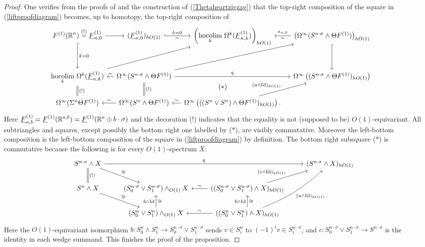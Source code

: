 \documentclass[a4paper, oneside]{amsart}
\DeclareMathOperator{\hocolim}{\operatorname{hocolim}}
\newcommand{\Id}{\mathrm{Id}}
\newcommand{\1}{\mathds{1}}
\theoremstyle{remark}
\theoremstyle{definition}
\newcommand{\R}{{\scaleobj{0.97}{\mathbb{R}}}}
\numberwithin{equation}{section}
\begin{document}
\begin{proof}
One verifies from the proofs of \cite[Prop. 7.2 \& Thm. 7.3]{WeissOrthCalc} and the construction of (\ref{Thetaheartzigzag}) that the top-right composition of the square in (\ref{liftproofdiagram}) becomes, up to homotopy, the top-right composition of
$$
\begin{tikzcd}[row sep = 15pt, column sep = 10pt]
F^{(1)}(\R^n)\overset{(!)}= \underline{F}^{(1)}_{n,0}\ar[dd,hook, "k=0"]\rar & (\underline F^{(1)}_{n,0})_{hO(1)}\rar[hook,"\sim"',"k=0"] & \left(\underset{k}{\hocolim}\ \Omega^k(\underline{F}^{(1)}_{n,k})\right)_{hO(1)} & \lar["s_{n,0}"', "\sim"]\left(\Omega^\infty(S^{n\cdot\sigma}\wedge \Theta F^{(1)})\right)_{hO(1)}\ar[dd,hook]\\
&&&&\\
\underset{k}{\hocolim}\ \Omega^k(\underline F^{(1)}_{n,k})\dar[equal, "(!)"]\ar[uurr]& \ar[uurr] \lar["\sim"'] \Omega^\infty(S^{n\cdot\sigma}\wedge\Theta F^{(1)})\dar[equal, "(!)"]\ar[rr, "q"] &\hspace{3pt}&\Omega^\infty\left((S^{n\cdot\sigma}\wedge \Theta F^{(1)})_{hO(1)}\right)\\
\Omega^\infty(\Sigma^n\Theta F^{(1)}) & \Omega^\infty(S^n\wedge\Theta F^{(1)})\lar["\sim"']&\lar["\sim"']\Omega^\infty\left(((S^n\vee S^n)\wedge \Theta F^{(1)})_{hO(1)}\right).\ar[u, phantom, bend left=50, "(*)"]\ar[ur, "(a\wedge \Id)_{hO(1)}"]&
\end{tikzcd}
$$
Here $\underline{F}^{(1)}_{a,b}=\underline{F}^{(1)}(\R^{a,b})=\underline{F}^{(1)}(\R^{a}\oplus b\cdot\sigma)$ and the decoration (!) indicates that the equality is not (supposed to be) $O(1)$-equivariant. All subtriangles and squares, except possibly the bottom right one labelled by ($*$), are visibly commutative. Moreover the left-bottom composition is the left-bottom composition of the square in (\ref{liftproofdiagram}) by definition. The bottom right subsquare ($*$) is commutative because the following is for every $O(1)$-spectrum $X$:
$$
\begin{tikzcd}
S^{n\cdot\sigma}\wedge X\dar[equal, "(!)"]\ar[rrr,"q"]\ar[dr, "\cong"]&&&(S^{n\cdot\sigma}\wedge X)_{hO(1)}\\
S^n\wedge X\ar[dr, "\cong"] &(S^{n\cdot\sigma}_0\vee S^{n\cdot\sigma}_1)\wedge_{O(1)}X &\lar["\sim"'] ((S^{n\cdot\sigma}_0\vee S^{n\cdot\sigma}_1)\wedge X)_{hO(1)}\ar[ur, "(c\wedge \Id)_{hO(1)}"]&\\
 &(S^{n}_0\vee S^{n}_1)\wedge_{O(1)}X\uar["b\wedge \Id", "\cong"'] &\lar["\sim"'] ((S^{n}_0\vee S^{n}_1)\wedge X)_{hO(1)}\uar["b\wedge \Id", "\cong"']\ar[uur, bend right=10, "(a\wedge \Id)_{hO(1)}"']&
\end{tikzcd}
$$
Here the $O(1)$-equivariant isomorphism $b: S^n_0\wedge S^n_1\to S^{n\cdot\sigma}_0 \vee S^{n\cdot\sigma}_1$ sends $v\in S^n_i$ to $(-1)^{i}v\in S^{n\cdot\sigma}_i$, and $c: S^{n\cdot\sigma}_0 \vee S^{n\cdot\sigma}_1\to S^{n\cdot\sigma}$ is the identity in each wedge summand. This finishes the proof of the proposition.
\end{proof}
\end{document}
